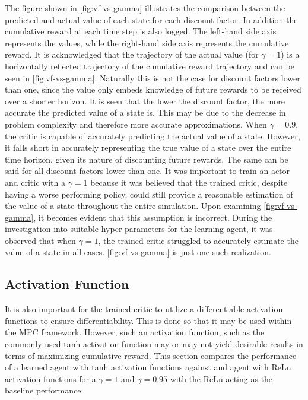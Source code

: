The figure shown in \autoref{fig:vf-vs-gamma}  illustrates the comparison between the predicted and actual value of each state for each discount factor. In addition the cumulative reward at each time step is also logged. The left-hand side axis represents the values, while the right-hand side axis represents the cumulative reward. It is acknowledged that the trajectory of the actual value  (for $\gamma = 1$) is a horizontally reflected trajectory of the cumulative reward trajectory and can be seen in \autoref{fig:vf-vs-gamma}. Naturally this is not the case for discount factors lower than one, since the value only embeds knowledge of future rewards to be received over a shorter horizon. It is seen that the lower the discount factor, the more accurate the predicted value of a state is. This may be due to the decrease in problem complexity and therefore more accurate approximations. When $\gamma = 0.9$, the critic is capable of accurately predicting the actual value of a state. However, it falls short in accurately representing the true value of a state over the entire time horizon, given its nature of discounting future rewards. The same can be said for all discount factors lower than one. It was important to train an actor and critic with a $\gamma = 1$ because it was believed that the trained critic, despite having a worse performing policy,  could still provide a reasonable estimation of the value of a state throughout the entire simulation. Upon examining \autoref{fig:vf-vs-gamma}, it becomes evident that this assumption is incorrect. During the investigation into suitable hyper-parameters for the learning agent, it was observed that when $\gamma = 1$, the trained critic struggled to accurately estimate the value of a state in all cases. \autoref{fig:vf-vs-gamma} is just one such realization. 

\subsection{Activation Function}
It is also important for the trained critic to utilize a differentiable activation functions to ensure differentiability. This is done so that it may be used within the MPC framework. However, such an activation function, such as the commonly used tanh activation function may or may not yield desirable results in terms of maximizing cumulative reward. This section compares the performance of a learned agent with tanh activation functions against and agent with ReLu activation functions for a $\gamma = 1$ and $\gamma = 0.95$ with the ReLu acting as the baseline performance. 


